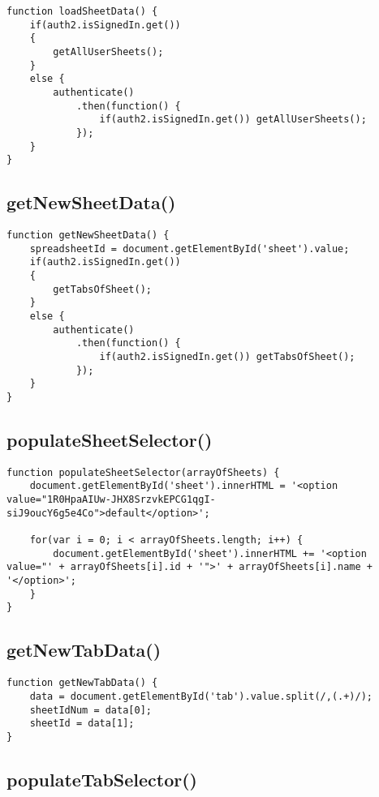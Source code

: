 \documentclass[letterpaper]{article}
\begin{document}
\begin{lstlisting}[firstnumber=7]
function loadSheetData() {
    if(auth2.isSignedIn.get())
    {
        getAllUserSheets();
    }
    else {
        authenticate()
            .then(function() {
                if(auth2.isSignedIn.get()) getAllUserSheets();
            });
    }
}
\end{lstlisting}

\subsection{getNewSheetData()}

\begin{lstlisting}[firstnumber=20]
function getNewSheetData() {
    spreadsheetId = document.getElementById('sheet').value;
    if(auth2.isSignedIn.get())
    {
        getTabsOfSheet();
    }
    else {
        authenticate()
            .then(function() {
                if(auth2.isSignedIn.get()) getTabsOfSheet();
            });
    }
}
\end{lstlisting}

\subsection{populateSheetSelector()}

\begin{lstlisting}[firstnumber=34]
function populateSheetSelector(arrayOfSheets) {
    document.getElementById('sheet').innerHTML = '<option value="1R0HpaAIUw-JHX8SrzvkEPCG1qgI-siJ9oucY6g5e4Co">default</option>';

    for(var i = 0; i < arrayOfSheets.length; i++) {
        document.getElementById('sheet').innerHTML += '<option value="' + arrayOfSheets[i].id + '">' + arrayOfSheets[i].name + '</option>';
    }
}
\end{lstlisting}

\subsection{getNewTabData()}

\begin{lstlisting}[firstnumber=42]
function getNewTabData() {
    data = document.getElementById('tab').value.split(/,(.+)/);
    sheetIdNum = data[0];
    sheetId = data[1];
}
\end{lstlisting}

\subsection{populateTabSelector()}
\end{document}
